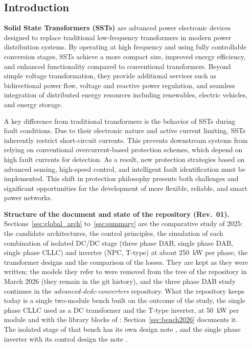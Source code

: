 \documentclass[12pt,a4paper]{scrartcl}
\begin{document}
	
	\tableofcontents
	\listoffigures
	\listoftables
	\newpage

\begin{onehalfspace}
\section{Introduction}
\textbf{Solid State Transformers (SSTs)} are advanced power electronic devices designed to replace traditional low-frequency transformers in modern power distribution systems. By operating at high frequency and using fully controllable conversion stages, SSTs achieve a more compact size, improved energy efficiency, and enhanced functionality compared to conventional transformers. Beyond simple voltage transformation, they provide additional services such as bidirectional power flow, voltage and reactive power regulation, and seamless integration of distributed energy resources including renewables, electric vehicles, and energy storage.

A key difference from traditional transformers is the behavior of SSTs during fault conditions. Due to their electronic nature and active current limiting, SSTs inherently restrict short-circuit currents. This prevents downstream systems from relying on conventional overcurrent-based protection schemes, which depend on high fault currents for detection. As a result, new protection strategies based on advanced sensing, high-speed control, and intelligent fault identification must be implemented. This shift in protection philosophy presents both challenges and significant opportunities for the development of more flexible, reliable, and smart power networks.

\noindent\textbf{Structure of the document and state of the repository (Rev.~01).} Sections~\ref{sec:global_arch} to~\ref{sec:summary} are the comparative study of 2025: the candidate architectures, the control principles, the simulation of each combination of isolated DC/DC stage (three phase DAB, single phase DAB, single phase CLLC) and inverter (NPC, T-type) at about \SI{250}{\kilo\watt} per phase, the transformer designs and the comparison of the losses. They are kept as they were written; the models they refer to were removed from the tree of the repository \cite{sst_repo} in March 2026 (they remain in the git history), and the three phase DAB study continues in the \textit{advanced-dcdc-converters} repository. What the repository keeps today is a single two-module bench built on the outcome of the study, the single phase CLLC used as a DC transformer and the T-type inverter, at \SI{50}{\kilo\watt} per module and with the library blocks of \cite{library_repo}: Section~\ref{sec:bench2026} documents it. The isolated stage of that bench has its own design note \cite{cllc_dcx_doc}, and the single phase inverter with its control design the note \cite{spinv_doc}.


\end{onehalfspace}
\end{document}

